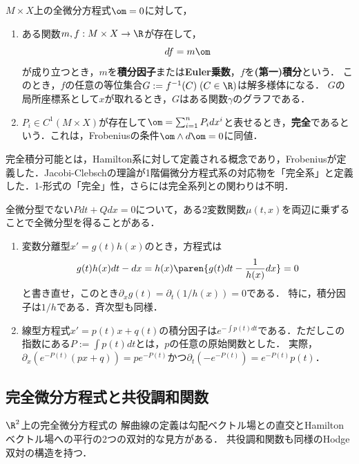 \documentclass[uplatex,dvipdfmx]{jsreport}
\begin{document}
\begin{definition}
    $M\times X$上の全微分方程式$\om=0$に対して，
    \begin{enumerate}
        \item ある関数$m,f:M\times X\to\R$が存在して，
        \[df=m\om\]
        が成り立つとき，$m$を\textbf{積分因子}または\textbf{Euler乗数}\cite{吉田耕作-微分方程式}，$f$を\textbf{(第一)積分}という．
        このとき，$f$の任意の等位集合$G:=f^{-1}(C)\;(C\in\R)$は解多様体になる．
        $G$の局所座標系として$x$が取れるとき，$G$はある関数$\gamma$のグラフである．
        \item $P_i\in C^1(M\times X)$が存在して$\om=\sum_{i=1}^nP_idx^i$と表せるとき，\textbf{完全}であるという．これは，Frobeniusの条件$\om\wedge d\om=0$に同値．
    \end{enumerate}
\end{definition}
\begin{history}
    完全積分可能とは，Hamilton系に対して定義される概念であり，Frobeniusが定義した．Jacobi-Clebschの理論が1階偏微分方程式系の対応物を「完全系」と定義した\cite{Bourbaki-数学史}．1-形式の「完全」性，さらには完全系列との関わりは不明．
\end{history}

\begin{example}[積分因子について]
    全微分型でない$Pdt+Qdx=0$について，ある2変数関数$\mu(t,x)$を両辺に乗ずることで全微分型を得ることがある．
    \begin{enumerate}
        \item 変数分離型$x'=g(t)h(x)$のとき，方程式は
        \[g(t)h(x)dt-dx=h(x)\paren{g(t)dt-\frac{1}{h(x)}dx}=0\]
        と書き直せ，このとき$\partial_xg(t)=\partial_t(1/h(x))=0$である．
        特に，積分因子は$1/h$である．斉次型も同様．
        \item 線型方程式$x'=p(t)x+q(t)$の積分因子は$e^{-\int p(t)dt}$である．ただしこの指数にある$P:=\int p(t)dt$とは，$p$の任意の原始関数とした．
        実際，$\partial_x(e^{-P(t)}(px+q))=pe^{-P(t)}$かつ$\partial_t(-e^{-P(t)})=e^{-P(t)}p(t)$．
    \end{enumerate}
\end{example}

\subsection{完全微分方程式と共役調和関数}

\begin{tcolorbox}[colframe=ForestGreen, colback=ForestGreen!10!white,breakable,colbacktitle=ForestGreen!40!white,coltitle=black,fonttitle=\bfseries\sffamily,
title=]
    $\R^2$上の完全微分方程式の
    解曲線の定義は勾配ベクトル場との直交とHamiltonベクトル場への平行の2つの双対的な見方がある．
    共役調和関数も同様のHodge双対の構造を持つ．
\end{tcolorbox}
\end{document}
